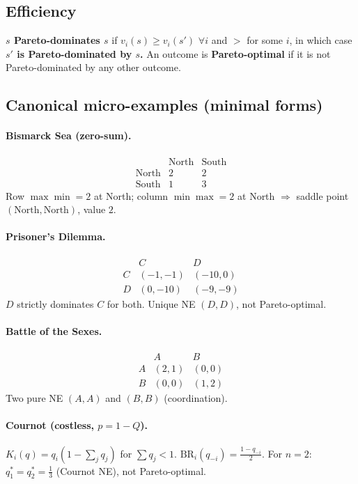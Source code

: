 \documentclass[10pt]{article}
\newcommand{\vi}{v_i}
\newcommand{\BR}{\mathrm{BR}}
\begin{document}
\subsection*{Efficiency}
\textbf{$s$ Pareto-dominates $s$} if $\vi(s)\ge \vi(s')$ $\forall i$ and $>$ for some $i$, in which case \textbf{$s'$ is Pareto-dominated by $s$.} An outcome is \textbf{Pareto-optimal} if it is not Pareto-dominated by any other outcome. 

\subsection*{Canonical micro-examples (minimal forms)}
\paragraph{Bismarck Sea (zero-sum).}
\[
\begin{array}{c|cc}
& \text{North} & \text{South}\\\hline
\text{North} & 2 & 2\\
\text{South} & 1 & 3
\end{array}
\]
Row $\max\min=2$ at North; column $\min\max=2$ at North $\Rightarrow$ saddle point $(\text{North},\text{North})$, value $2$.

\paragraph{Prisoner’s Dilemma.}
\[
\begin{array}{c|cc}
 & C & D\\\hline
C &(-1,-1)&(-10,0)\\
D &(0,-10)&(-9,-9)
\end{array}
\]
$D$ strictly dominates $C$ for both. Unique NE $(D,D)$, not Pareto-optimal.

\paragraph{Battle of the Sexes.}
\[
\begin{array}{c|cc}
 & A & B\\\hline
A&(2,1)&(0,0)\\
B&(0,0)&(1,2)
\end{array}
\]
Two pure NE $(A,A)$ and $(B,B)$ (coordination).

\paragraph{Cournot (costless, $p=1-Q$).} $K_i(q)=q_i(1-\sum_j q_j)$ for $\sum q_j<1$. $\BR_i(q_{-i})=\tfrac{1-q_{-i}}{2}$. For $n=2$: $q_1^*=q_2^*=\tfrac13$ (Cournot NE), not Pareto-optimal.
\end{document}
